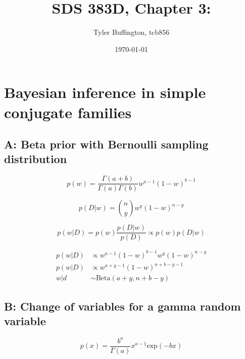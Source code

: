 \documentclass[12pt]{article}%
\begin{document}
      \title{SDS 383D, Chapter 3: }
      \author{Tyler Buffington, tcb856}
      \date{\today}
      \maketitle

      \section*{Bayesian inference in simple conjugate families}

      \subsection*{A: Beta prior with Bernoulli sampling distribution}

            \begin{equation}\label{eq:prior}
                  p(w) = \frac{\Gamma(a+b)}{\Gamma(a)\Gamma(b)}w^{a-1}(1-w)^{b-1}
            \end{equation}

            \begin{equation}\label{eq:likelihood}
                  p(D|w) = \binom{n}{y} w^y (1 - w)^{n-y}
            \end{equation}

            \begin{equation}\label{eq:posterior_1}
                  p(w|D) = p(w) \frac{p(D|w)}{p(D)} \propto p(w) p(D|w)
            \end{equation}

            \begin{align}
                  p(w|D) &\propto w^{a-1}(1-w)^{b-1}w^y(1-w)^{n-y} \\
                  p(w|D) &\propto w^{a+y-1}(1-w)^{n+b-y-1} \\
                  w|d &\sim \text{Beta}(a+y, n+b-y)
            \end{align}


      \subsection*{B: Change of variables for a gamma random variable}

            \begin{equation}\label{eq:gamma}
                  p(x) = \frac{b^a}{\Gamma(a)}x^{a-1} \text{exp}(-bx)
            \end{equation}
\end{document}
